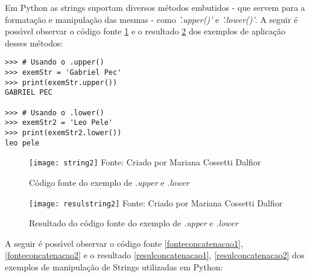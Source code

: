 Em Python as strings suportam diversos m\'{e}todos embutidos - que servem para a formata\c{c}\~{a}o e manipula\c{c}\~{a}o das mesmas - como \textsl{'.upper()'} e \textsl{'.lower()'}. A seguir \'{e} poss\'{\i}vel observar o c\'{o}digo fonte \ref{fontestrings2} e o resultado \ref{resulstrings2} dos exemplos de aplica\c{c}\~{a}o desses m\'{e}todos:

\begin{lstlisting}
>>> # Usando o .upper()
>>> exemStr = 'Gabriel Pec'
>>> print(exemStr.upper())
GABRIEL PEC

>>> # Usando o .lower()
>>> exemStr2 = 'Leo Pele'
>>> print(exemStr2.lower())
leo pele
\end{lstlisting}

\begin{figure}[H]
	\begin{center}
		\caption{C\'{o}digo fonte do exemplo de \textsl{.upper} e \textsl{.lower}} \label{fontestrings2}
		\texttt{[image: string2]} 
		\newline
		Fonte: Criado por Mariana Cossetti Dalfior
	\end{center}
\end{figure}

\begin{figure}[H]
	\begin{center}
		\caption{Resultado do c\'{o}digo fonte do exemplo de \textsl{.upper} e \textsl{.lower}} \label{resulstrings2}
		\texttt{[image: resulstring2]} 
		\newline
		Fonte: Criado por Mariana Cossetti Dalfior
	\end{center}
\end{figure}

A seguir \'{e} poss\'{\i}vel observar o c\'{o}digo fonte \ref{fonteconcatenacao1}, \ref{fonteconcatenacao2} e o resultado \ref{resulconcatenacao1}, \ref{resulconcatenacao2} dos exemplos de manipula\c{c}\~{a}o de Strings utilizadas em Python:

